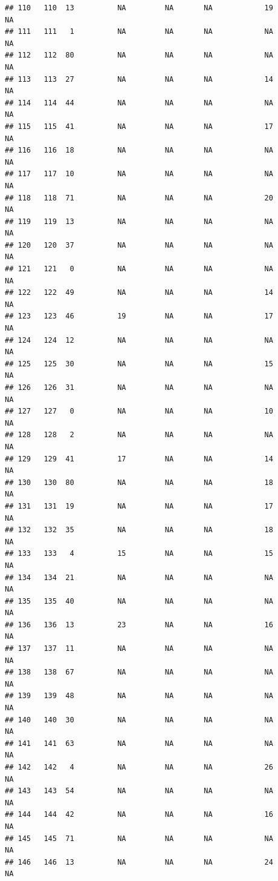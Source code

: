 \documentclass[man]{apa6}
\begin{document}
\begin{verbatim}
## 110   110  13          NA         NA       NA            19       NA
## 111   111   1          NA         NA       NA            NA       NA
## 112   112  80          NA         NA       NA            NA       NA
## 113   113  27          NA         NA       NA            14       NA
## 114   114  44          NA         NA       NA            NA       NA
## 115   115  41          NA         NA       NA            17       NA
## 116   116  18          NA         NA       NA            NA       NA
## 117   117  10          NA         NA       NA            NA       NA
## 118   118  71          NA         NA       NA            20       NA
## 119   119  13          NA         NA       NA            NA       NA
## 120   120  37          NA         NA       NA            NA       NA
## 121   121   0          NA         NA       NA            NA       NA
## 122   122  49          NA         NA       NA            14       NA
## 123   123  46          19         NA       NA            17       NA
## 124   124  12          NA         NA       NA            NA       NA
## 125   125  30          NA         NA       NA            15       NA
## 126   126  31          NA         NA       NA            NA       NA
## 127   127   0          NA         NA       NA            10       NA
## 128   128   2          NA         NA       NA            NA       NA
## 129   129  41          17         NA       NA            14       NA
## 130   130  80          NA         NA       NA            18       NA
## 131   131  19          NA         NA       NA            17       NA
## 132   132  35          NA         NA       NA            18       NA
## 133   133   4          15         NA       NA            15       NA
## 134   134  21          NA         NA       NA            NA       NA
## 135   135  40          NA         NA       NA            NA       NA
## 136   136  13          23         NA       NA            16       NA
## 137   137  11          NA         NA       NA            NA       NA
## 138   138  67          NA         NA       NA            NA       NA
## 139   139  48          NA         NA       NA            NA       NA
## 140   140  30          NA         NA       NA            NA       NA
## 141   141  63          NA         NA       NA            NA       NA
## 142   142   4          NA         NA       NA            26       NA
## 143   143  54          NA         NA       NA            NA       NA
## 144   144  42          NA         NA       NA            16       NA
## 145   145  71          NA         NA       NA            NA       NA
## 146   146  13          NA         NA       NA            24       NA

\end{verbatim}
\end{document}
